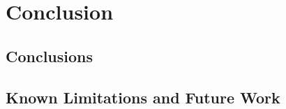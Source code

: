\chapter{Conclusion}\label{ch:conclusion}

\section{Conclusions}\label{sec:conclusions}

\section{Known Limitations and Future Work}\label{sec:fut_work}

    


